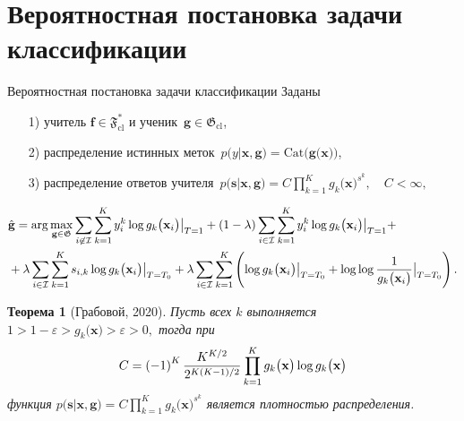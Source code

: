 \documentclass[10pt,pdf,hyperref={unicode}]{beamer}
\newtheorem{rustheorem}{Теорема}
\begin{document}
\section{Вероятностная постановка задачи классификации}
\begin{frame}{Вероятностная постановка задачи классификации}
Заданы
\begin{enumerate}
	\item[1)] учитель $\mathbf{f}\in\mathfrak{F}_{\text{cl}}^{*}$ и ученик~$\mathbf{g}\in\mathfrak{G}_{\text{cl}}$,
	\item[2)] распределение истинных меток~$p\bigr(y|\mathbf{x}, \mathbf{g}\bigr) = \text{Cat}\bigr(\mathbf{g}\bigr(\mathbf{x}\bigr)\bigr)$,
	\item[3)] распределение ответов учителя~$p\bigr(\mathbf{s}|\mathbf{x}, \mathbf{g}\bigr) = C\prod_{k=1}^{K}g_k\bigr(\mathbf{x}\bigr)^{s^k}, \quad C < \infty,$
\end{enumerate}
\[
\setlength\abovedisplayskip{0pt}
\begin{aligned}
&\hat{\mathbf{g}} = \arg\max_{\mathbf{g}\in \mathfrak{G}} \sum_{i\not\in \mathcal{I}}\sum_{k=1}^{K}y_i^k\log g_k\bigr(\mathbf{x}_i\bigr)\bigr|_{T=1} 
+ \left(1-\lambda\right)\sum_{i\in \mathcal{I}}\sum_{k=1}^{K}y_i^k\log g_k\bigr(\mathbf{x}_i\bigr)\bigr|_{T=1} +\\
&+ \lambda\sum_{i\in \mathcal{I}}\sum_{k=1}^{K}s_{i,k}\log g_k\bigr(\mathbf{x}_i\bigr)\bigr|_{T=T_0} 
+ \lambda \sum_{i\in \mathcal{I}}\sum_{k=1}^{K}\left(\log g_k\bigr(\mathbf{x}_i\bigr)\bigr|_{T=T_0} + \log\log\frac{1}{g_k\bigr(\mathbf{x}_i\bigr)}\bigr|_{T=T_0}\right).
\end{aligned}
\setlength\belowdisplayskip{0pt}
\]

\begin{rustheorem}[Грабовой, 2020]
\justifying
\label{theorem:st:dist}
Пусть всех $k$ выполняется $1 > 1- \varepsilon > g_k\bigr(\mathbf{x}\bigr) > \varepsilon > 0,$ тогда при
\[
\setlength\abovedisplayskip{0pt}
C=\left(-1\right)^{K}\frac{K^{K/2}}{2^{K(K-1)/2}}\prod_{k=1}^{K}g_k\bigr(\mathbf{x}\bigr)\log g_k\bigr(\mathbf{x}\bigr)
\setlength\belowdisplayskip{0pt}
\]
функция $p\bigr(\mathbf{s}|\mathbf{x}, \mathbf{g}\bigr) = C\prod_{k=1}^{K}g_k\bigr(\mathbf{x}\bigr)^{s^k}$ является плотностью распределения.
\end{rustheorem}

\end{frame}
\end{document}
